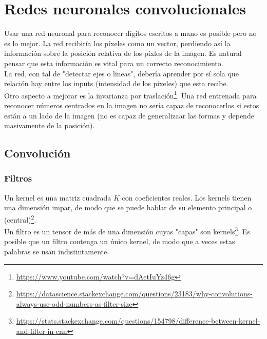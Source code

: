 \documentclass{article}
\begin{document}
\section{Redes neuronales convolucionales}

Usar una red neuronal para reconocer dígitos escritos a mano es posible pero no es lo mejor. La red recibiría los píxeles como un vector, perdiendo así la información sobre la posición relativa de los píxles de la imagen. Es natural pensar que esta información es vital para un correcto reconocimiento.\\

La red, con tal de "detectar ejes o lineas", debería aprender por sí sola que relación hay entre los inputs (intensidad de los pixeles) que esta recibe.\\

Otro aspecto a mejorar es la invarianza por traslación\footnote{\url{https://www.youtube.com/watch?v=dAetIuYz46g}}. Una red entrenada para reconocer números centrados en la imagen no sería capaz de reconocerlos si estos están a un lado de la imagen (no es capaz de generalizaar las formas y depende masivamente de la posición).

\subsection{Convolución}

\subsubsection{Filtros}
Un kernel es una matriz cuadrada $K$ con coeficientes reales. Los kernels tienen una dimensión impar, de modo que se puede hablar de su elemento principal o (central)\footnote{\url{https://datascience.stackexchange.com/questions/23183/why-convolutions-always-use-odd-numbers-as-filter-size}}.\\

Un filtro es un tensor de más de una dimensión cuyas "capas" son kernels\footnote{\url{https://stats.stackexchange.com/questions/154798/difference-between-kernel-and-filter-in-cnn}}. Es posible que un filtro contenga un único kernel, de modo que a veces estas palabras se usan indistintamente.\\
\end{document}
